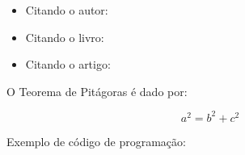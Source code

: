 \begin{itemize}%
  \item Citando o autor: 
  \item Citando o livro: \cite{Goodfellow2016}
  \item Citando o artigo: \cite{FernandezCaballero2016}
\end{itemize}
    

O Teorema de Pitágoras é dado por:

\begin{equation}
	a^{2}= b^{2}+c^{2}
\end{equation}

Exemplo de código de programação:
  

